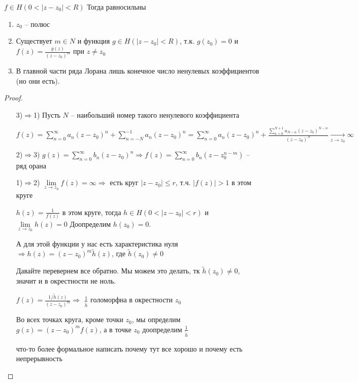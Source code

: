 \begin{theorem}\thmslashn
	
	$f\in H(0 < |z - z_0| < R)$ Тогда равносильны 
	
	\begin{enumerate}
		\item 
		$z_0$ -- полюс
		
		\item
		Существует $m \in N$ и функция $g\in H(|z - z_0| < R)$, т.к. $g(z_0) = 0$ и $f(z) = \frac{g(z)}{(z-z_0)^m}$ при $z \not = z_0$
		
		\item
		В главной части ряда Лорана лишь конечное число ненулевых коэффициентов (но они есть).
	\end{enumerate}
	
\end{theorem}

\begin{proof}\thmslashn
	
	\begin{enumerate}
		\item[3)$\Rightarrow$1)] 
		Пусть $N$ -- наибольший номер такого ненулевого коэффициента
		
		$f(z) = \sum\limits_{n=0}^{\infty} a_n(z - z_0)^n + \sum\limits_{n=-N}^{-1} a_n (z - z_0)^n = \sum\limits_{n=0}^{\infty} a_n(z - z_0)^n + \frac{\sum\limits_{n=0}^{N+1} a_{N-n}(z-z_0)^{N-n}}{(z - z_0)^N} \underset{z\to z_0}\to \infty$
		
		\item[2)$\Rightarrow$3)]
		$g(z) = \sum\limits_{n=0}^{\infty} b_n(z-z_0)^n \Rightarrow f(z) = \sum\limits_{n=0}^\infty b_n(z-z_0^{n-m})$ -- ряд орана
		
		\item[1)$\Rightarrow$2)]
		$\lim\limits_{z \to z_0}f(z) = \infty \Rightarrow$ есть круг $|z - z_0| \leqslant r$, т.ч. $|f(z)| > 1$ в этом круге 
		
		$h(z) = \frac{1}{f(z)}$ в этом круге, тогда  $h \in H(0 < |z - z_0| < r)$ и $\lim\limits_{z \to z_0} h(z) = 0$ Доопределим $h(z_0) = 0$.
		
		А для этой функции у нас есть характеристика нуля $\Rightarrow h(z) = (z-z_0)^m \tilde{h}(z)$, где $\tilde{h}(z_0) \not = 0$
		
		Давайте перевернем все обратно. Мы можем это делать, тк $\tilde{h}(z_0) \not = 0$, значит и в окрестности не ноль.
		
		$f(z) = \frac{1/\tilde{h}(z)}{(z - z_0)^m} \Rightarrow$ $\frac{1}{\tilde{h}}$ голоморфна в окрестности $z_0$
		
		Во всех точках круга, кроме точки $z_0$, мы определим $g(z) = (z-z_0)^mf(z)$, а в точке $z_0$ доопределим $\frac{1}{\tilde{h}}$
		
		\TODO что-то более формальное написать почему тут все хорошо и почему есть непрерывность
	\end{enumerate}
	
\end{proof}

